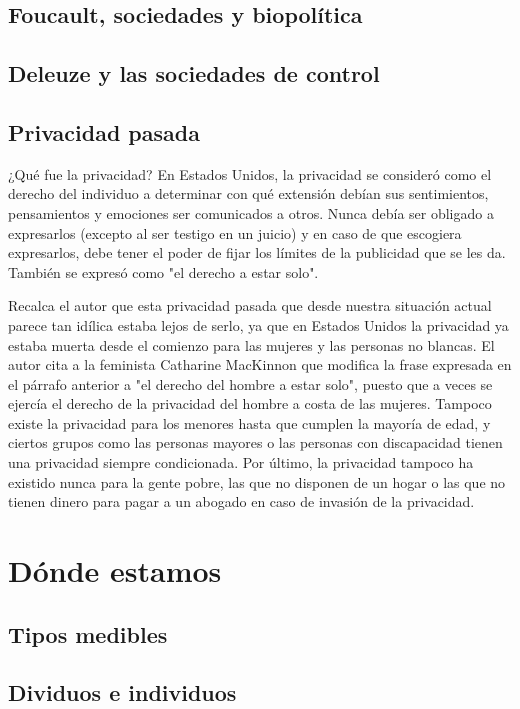 \documentclass[11pt]{article}
\begin{document}
\subsection{Foucault, sociedades y biopolítica}
\subsection{Deleuze y las sociedades de control}
\subsection{Privacidad pasada}
¿Qué fue la privacidad? En Estados Unidos, la privacidad se consideró como el derecho del individuo a determinar con qué extensión debían sus sentimientos, pensamientos y emociones ser comunicados a otros. Nunca debía ser obligado a expresarlos (excepto al ser testigo en un juicio) y en caso de que escogiera expresarlos, debe tener el poder de fijar los límites de la publicidad que se les da. También se expresó como "el derecho a estar solo".

Recalca el autor que esta privacidad pasada que desde nuestra situación actual parece tan idílica estaba lejos de serlo, ya que en Estados Unidos la privacidad ya estaba muerta desde el comienzo para las mujeres y las personas no blancas. El autor cita a la feminista Catharine MacKinnon que modifica la frase expresada en el párrafo anterior a "el derecho del hombre a estar solo", puesto que a veces se ejercía el derecho de la privacidad del hombre a costa de las mujeres. Tampoco existe la privacidad para los menores hasta que cumplen la mayoría de edad, y ciertos grupos como las personas mayores o las personas con discapacidad tienen una privacidad siempre condicionada. Por último, la privacidad tampoco ha existido nunca para la gente pobre, las que no disponen de un hogar o las que no tienen dinero para pagar a un abogado en caso de invasión de la privacidad.
\section{Dónde estamos}
\subsection{Tipos medibles}
\subsection{Dividuos e individuos}
\end{document}
